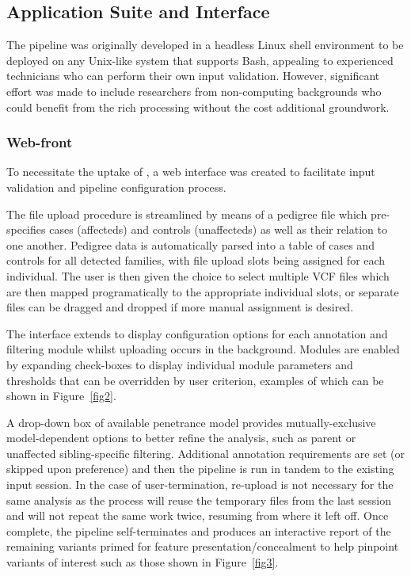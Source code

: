 \subsection{Application Suite and Interface}

The pipeline was originally developed in a headless Linux shell environment to be deployed on any Unix-like system that supports Bash, appealing to experienced technicians who can perform their own input validation. However, significant effort was made to include researchers from non-computing backgrounds who could benefit from the rich processing without the cost additional groundwork.


\subsubsection{Web-front}

To necessitate the uptake of \app{}, a web interface was created to facilitate input validation and pipeline configuration process.

The file upload procedure is streamlined by means of a pedigree file which pre-specifies cases (affecteds) and controls (unaffecteds) as well as their relation to one another. Pedigree data is automatically parsed into a table of cases and controls for all detected families, with file upload slots being assigned for each individual. The user is then given the choice to select multiple VCF files which are then mapped programatically  to the appropriate individual slots, or separate files can be dragged and dropped if more manual assignment is desired.

The interface extends to display configuration options for each annotation and filtering module whilst uploading occurs in the background. Modules are enabled by expanding check-boxes to display individual module parameters and thresholds that can be overridden by user criterion, examples of which can be shown in Figure~\ref{fig2}.

A drop-down box of available penetrance model provides mutually-exclusive model-dependent options to better refine the analysis, such as parent or unaffected sibling-specific filtering. Additional annotation requirements are set (or skipped upon preference) and then the pipeline is run in tandem to the existing input session. In the case of user-termination, re-upload is not necessary for the same analysis as the process will reuse the temporary files from the last session and will not repeat the same work twice, resuming from where it left off. Once complete, the pipeline self-terminates and produces an interactive report of the remaining variants primed for feature presentation/concealment to help pinpoint variants of interest such as those shown in Figure~\ref{fig3}.

